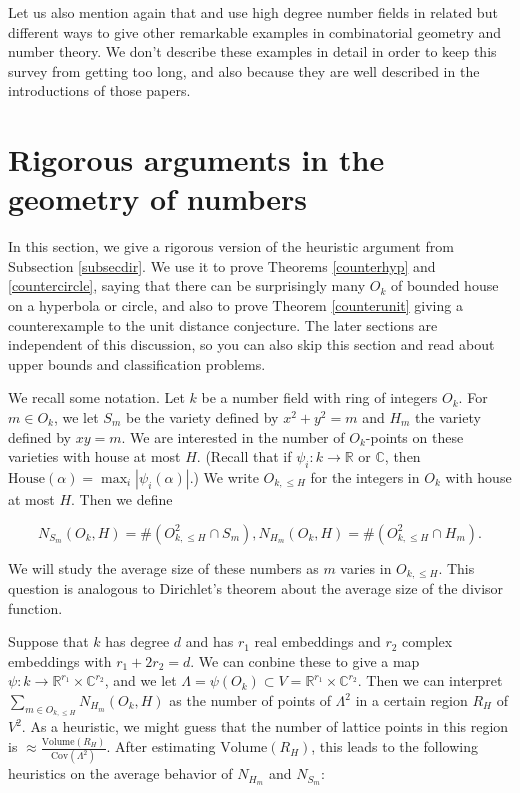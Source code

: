 \documentclass{amsart}
\newcommand{\CC}{\mathbb{C}}
\newcommand{\RR}{\mathbb{R}}
\newcommand{\house}{\textrm{House}}
\newcommand{\heur}{\approx}
\newcommand{\Volume}{\textrm{Volume}}
\newcommand{\Cov}{\textrm{Cov}}
\begin{document}
Let us also mention again that \cite{BSSZ} and \cite{Po1} use high degree number fields in related but different ways to give other remarkable examples in combinatorial geometry and number theory.  We don't describe these examples in detail in order to keep this survey from getting too long, and also because they are well described in the introductions of those papers.


\section{Rigorous arguments in the geometry of numbers} \label{secrigdir}

In this section,  we give a rigorous version of the heuristic argument from Subsection \ref{subsecdir}.   We use it to prove Theorems \ref{counterhyp} and \ref{countercircle}, saying that there can be surprisingly many $O_k$ of bounded house on a hyperbola or circle,  and also to prove Theorem \ref{counterunit} giving a counterexample to the unit distance conjecture.  The later sections are independent of this discussion, so you can also skip this section and read about upper bounds and classification problems.  

We recall some notation.  Let $k$ be a number field with ring of integers $O_k$.   For $m \in O_k$,  we let $S_m$ be the variety defined by $x^2 + y^2 = m$ and $H_m$ the variety defined by $x y = m$.   We are interested in the number of $O_k$-points on these varieties with house at most $H$.   (Recall that if $\psi_i: k \rightarrow \RR$ or $\CC$,  then $\house(\alpha) = \max_i |\psi_i(\alpha)|$.)  We write $O_{k, \le H}$ for the integers in $O_k$ with house at most $H$.   Then we define

$$ N_{S_m}(O_k, H) = \# ( O_{k, \le H}^2 \cap S_m),  N_{H_m}(O_k, H) = \# (O_{k, \le H}^2 \cap H_m ). $$

We will study the average size of these numbers as $m$ varies in $O_{k, \le H}$.   This question is analogous to Dirichlet's theorem about the average size of the divisor function.   

Suppose that $k$ has degree $d$ and has $r_1$ real embeddings and $r_2$ complex embeddings with $r_1 + 2 r_2 = d$.  We can conbine these to give a map $\psi: k \rightarrow \RR^{r_1} \times \CC^{r_2}$, and we let $\Lambda = \psi(O_k) \subset V  = \RR^{r_1} \times \CC^{r_2}$.  Then we can interpret $\sum_{m \in O_{k, \le H}} N_{H_m}(O_k, H)$ as the number of points of $\Lambda^2$ in a certain region $R_H$ of $V^2$.   As a heuristic,  we might guess that the number of lattice points in this region is $\heur \frac{\Volume(R_H)}{\Cov(\Lambda^2)}$.   After estimating $\Volume(R_H)$,  this leads to the following heuristics on the average behavior of $N_{H_m}$ and $N_{S_m}$:
\end{document}
